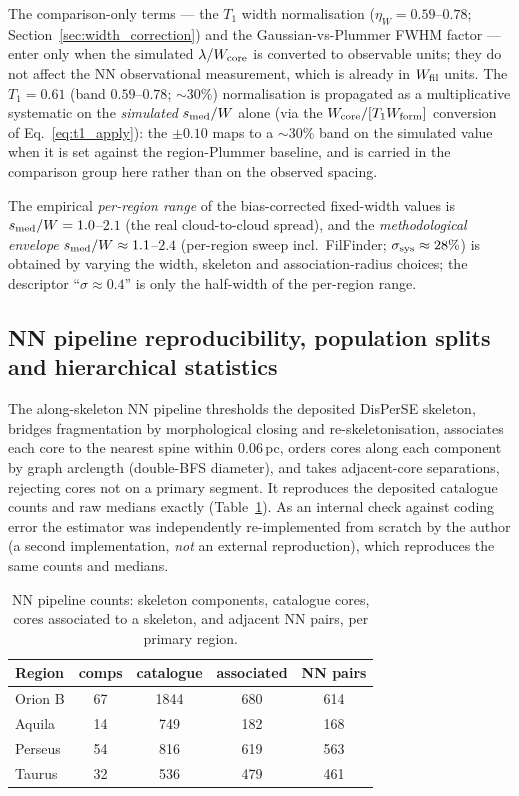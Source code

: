 \documentclass[usenatbib,twoside,twocolumn]{mnras}
\begin{document}
The comparison-only terms --- the $T_1$ width normalisation ($\eta_W=0.59$--$0.78$; Section~\ref{sec:width_correction}) and the Gaussian-vs-Plummer FWHM factor --- enter only when the simulated $\lambda/W_{\rm core}$ is converted to observable units; they do not affect the NN observational measurement, which is already in $W_{\rm fil}$ units. The $T_1=0.61$ (band $0.59$--$0.78$; $\sim30\%$) normalisation is propagated as a multiplicative systematic on the \emph{simulated} $s_{\rm med}/W$ alone (via the $W_{\rm core}/[T_1 W_{\rm form}]$ conversion of Eq.~\ref{eq:t1_apply}): the $\pm0.10$ maps to a $\sim30\%$ band on the simulated value when it is set against the region-Plummer baseline, and is carried in the comparison group here rather than on the observed spacing.

The empirical \emph{per-region range} of the bias-corrected fixed-width values is $s_{\rm med}/W=1.0$--$2.1$ (the real cloud-to-cloud spread), and the \emph{methodological envelope} $s_{\rm med}/W\approx1.1$--$2.4$ (per-region sweep incl.\ FilFinder; $\sigma_{\rm sys}\approx28\%$) is obtained by varying the width, skeleton and association-radius choices; the descriptor ``$\sigma\approx0.4$'' is only the half-width of the per-region range.

\subsection{NN pipeline reproducibility, population splits and hierarchical statistics}
\label{sec:nnpipeline}

The along-skeleton NN pipeline thresholds the deposited DisPerSE skeleton, bridges fragmentation by morphological closing and re-skeletonisation, associates each core to the nearest spine within $0.06$\,pc, orders cores along each component by graph arclength (double-BFS diameter), and takes adjacent-core separations, rejecting cores not on a primary segment. It reproduces the deposited catalogue counts and raw medians exactly (Table~\ref{tab:nnpipeline}). As an internal check against coding error the estimator was independently re-implemented from scratch by the author (a second implementation, \emph{not} an external reproduction), which reproduces the same counts and medians.

\begin{table}
\caption{NN pipeline counts: skeleton components, catalogue cores, cores associated to a skeleton, and adjacent NN pairs, per primary region.}
\label{tab:nnpipeline}
\footnotesize
\setlength{\tabcolsep}{4pt}
\begin{tabular}{lcccc}
\toprule
Region & comps & catalogue & associated & NN pairs \\
\midrule
Orion B & 67 & 1844 & 680 & 614 \\
Aquila  & 14 & 749  & 182 & 168 \\
Perseus & 54 & 816  & 619 & 563 \\
Taurus  & 32 & 536  & 479 & 461 \\
\bottomrule
\end{tabular}
\end{table}
\end{document}
